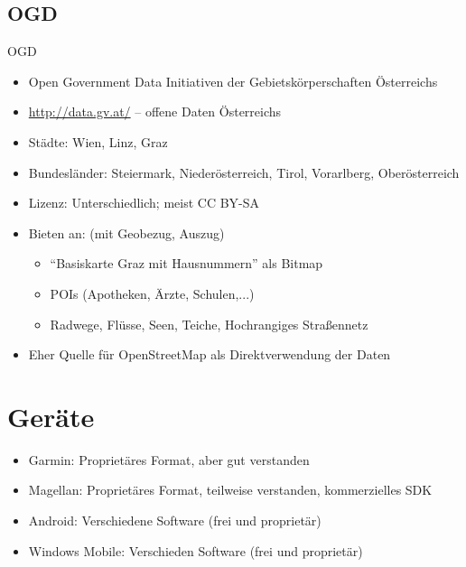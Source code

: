 \documentclass{beamer}
\begin{document}
\subsection{OGD}
\begin{frame}{OGD}
  \begin{itemize}
    \item Open Government Data Initiativen der Gebietskörperschaften
      Österreichs
    \item \url{http://data.gv.at/} -- offene Daten Österreichs
    \item Städte: Wien, Linz, Graz
    \item Bundesländer: Steiermark, Niederösterreich, Tirol,
      Vorarlberg, Oberösterreich
    \item Lizenz: Unterschiedlich; meist CC BY-SA
    \item Bieten an: (mit Geobezug, Auszug)
    \begin{itemize}
      \item ``Basiskarte Graz mit Hausnummern'' als Bitmap
      \item POIs (Apotheken, Ärzte, Schulen,...)
      \item Radwege, Flüsse, Seen, Teiche, Hochrangiges Straßennetz
    \end{itemize}
    \item Eher Quelle für OpenStreetMap als Direktverwendung der Daten
  \end{itemize}
\end{frame}

\section{Geräte}
\begin{frame}
  \begin{itemize}
    \item Garmin: Proprietäres Format, aber gut
      verstanden
    \item Magellan: Proprietäres Format, teilweise
      verstanden, kommerzielles SDK
    \item Android: Verschiedene Software (frei und proprietär)
    \item Windows Mobile: Verschieden Software (frei und proprietär)
  \end{itemize}
\end{frame}
\end{document}
